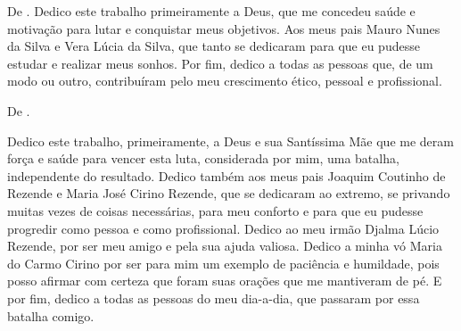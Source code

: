 \begin{dedicatoria}
	\vspace*{\fill}
	
	De \imprimirAutorUm.
	\newline
	Dedico este trabalho primeiramente a Deus, que me concedeu saúde e motivação
	para lutar e conquistar meus objetivos. Aos meus pais Mauro Nunes da Silva e
	Vera Lúcia da Silva, que tanto se dedicaram para que eu pudesse estudar e
	realizar meus sonhos. Por fim, dedico a todas as pessoas que, de um modo ou
	outro, contribuíram pelo meu crescimento ético, pessoal e profissional.
	
	\vspace*{\fill}
	De \imprimirAutorDois.
	\newline
	\par Dedico este trabalho, primeiramente, a Deus e sua Santíssima Mãe que me
	deram força e saúde para vencer esta luta, considerada por mim, uma
	batalha, independente do resultado. Dedico também aos meus pais Joaquim
	Coutinho de Rezende e Maria José Cirino Rezende, que se dedicaram ao extremo,
	se privando muitas vezes de coisas necessárias, para meu conforto e para que eu
	pudesse progredir como pessoa e como profissional. Dedico ao meu irmão Djalma
	Lúcio Rezende, por ser meu amigo e pela sua ajuda valiosa. Dedico a minha vó
	Maria do Carmo Cirino por ser para mim um exemplo de paciência e humildade,
	pois posso afirmar com certeza que foram suas orações que me mantiveram de pé.
	E por fim, dedico a todas as pessoas do meu dia-a-dia, que passaram por essa
	batalha comigo.

\end{dedicatoria}

